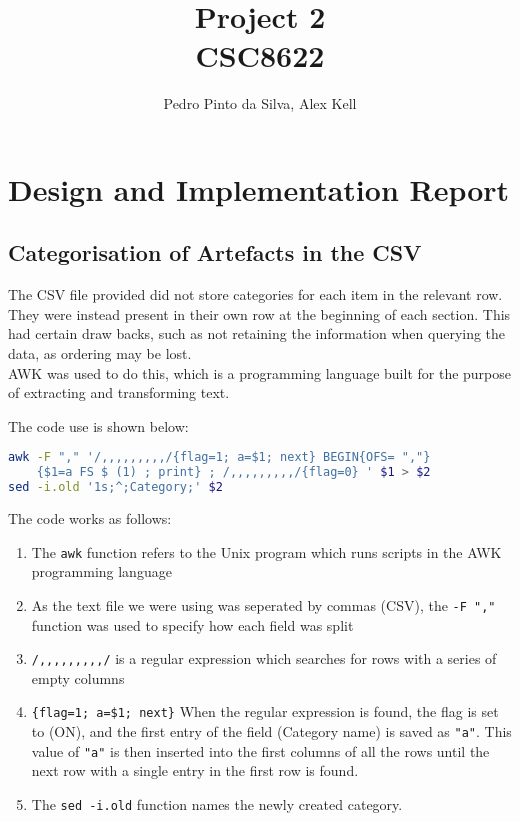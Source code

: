 \documentclass{article}
\begin{document}
\title{Project 2 \\ CSC8622}
\author{Pedro Pinto da Silva, Alex Kell}

\maketitle

\section*{Design and Implementation Report}


\subsection*{Categorisation of Artefacts in the CSV}

The CSV file provided did not store categories for each item in the relevant row.  They were instead present in their own row at the beginning of each section. This had certain draw backs, such as not retaining the information when querying the data, as ordering may be lost.\\

AWK was used to do this, which is a programming language built for the purpose of extracting and transforming text.

The code use is shown below:\\

\begin{lstlisting}[language = Bash]
awk -F "," '/,,,,,,,,,/{flag=1; a=$1; next} BEGIN{OFS= ","} 
	{$1=a FS $ (1) ; print} ; /,,,,,,,,,/{flag=0} ' $1 > $2
sed -i.old '1s;^;Category;' $2
\end{lstlisting}

The code works as follows: 
\begin{enumerate}
	\item  The \lstinline|awk| function refers to the Unix program which runs scripts in the AWK programming language
	\item As the text file we were using was seperated by commas (CSV), the \lstinline|-F ","| function was used to specify how each field was split
	\item \lstinline|/,,,,,,,,,/| is a regular expression which searches for rows with a  
	series of empty columns
	\item\lstinline|{flag=1; a=$1; next}| When the regular expression is found, the flag is set to (ON), and the first entry of the field (Category name) is saved as \lstinline|"a"|. This value of \lstinline|"a"| is then inserted into the first columns of all the rows until the next row with a single entry in the first row is found.
	\item The \lstinline|sed -i.old| function names the newly created category.
\end{enumerate}
\end{document}
